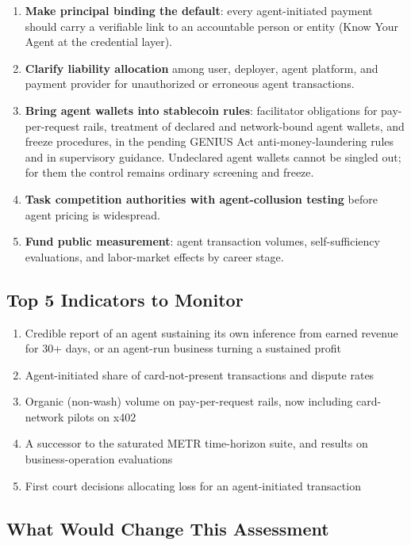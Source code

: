 \documentclass[11pt,letterpaper]{article}
\begin{document}
\begin{enumerate}
  \item \textbf{Make principal binding the default}: every agent-initiated payment should carry a verifiable link to an accountable person or entity (Know Your Agent at the credential layer).
  \item \textbf{Clarify liability allocation} among user, deployer, agent platform, and payment provider for unauthorized or erroneous agent transactions.
  \item \textbf{Bring agent wallets into stablecoin rules}: facilitator obligations for pay-per-request rails, treatment of declared and network-bound agent wallets, and freeze procedures, in the pending GENIUS Act anti-money-laundering rules and in supervisory guidance. Undeclared agent wallets cannot be singled out; for them the control remains ordinary screening and freeze.
  \item \textbf{Task competition authorities with agent-collusion testing} before agent pricing is widespread.
  \item \textbf{Fund public measurement}: agent transaction volumes, self-sufficiency evaluations, and labor-market effects by career stage.
\end{enumerate}

\subsection*{Top 5 Indicators to Monitor}

\begin{enumerate}
  \item Credible report of an agent sustaining its own inference from earned revenue for 30+ days, or an agent-run business turning a sustained profit
  \item Agent-initiated share of card-not-present transactions and dispute rates
  \item Organic (non-wash) volume on pay-per-request rails, now including card-network pilots on x402
  \item A successor to the saturated METR time-horizon suite, and results on business-operation evaluations
  \item First court decisions allocating loss for an agent-initiated transaction
\end{enumerate}

\subsection*{What Would Change This Assessment}
\end{document}
